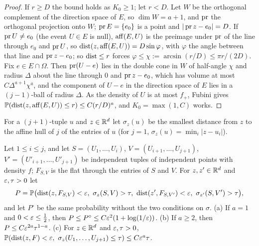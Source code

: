 \documentclass[11pt]{article}
\begin{document}
\begin{proof}
If $r\ge D$ the bound holds as $K_0\ge1$; let $r<D$. Let $W$ be the orthogonal complement of the direction space of $E$, so
$\dim W=a+1$, and $\operatorname{pr}$ the orthogonal projection onto $W$; $\operatorname{pr} E=\{e_0\}$ is a point and $|\operatorname{pr} z-e_0|=D$. If $\operatorname{pr} U\ne e_0$ (the event
$U\in E$ is null), $\operatorname{aff}(E,U)$ is the preimage under $\operatorname{pr}$ of the line through $e_0$ and $\operatorname{pr} U$, so $\operatorname{dist}(z,\operatorname{aff}(E,U))=D\sin\varphi$,
with $\varphi$ the angle between that line and $\operatorname{pr} z-e_0$; so $\operatorname{dist}\le r$ forces $\varphi\le\chi:=\arcsin(r/D)\le\pi r/(2D)$. Fix $e\in E\cap\Omega$.
Then $\operatorname{pr}(U-e)$ lies in the double cone in $W$ of half-angle $\chi$ and radius $\Delta$ about the line through $0$ and $\operatorname{pr} z-e_0$, which
has volume at most $C\Delta^{a+1}\chi^a$, and the component of $U-e$ in the direction space of $E$ lies in a $(j-1)$-ball of radius $\Delta$.
As the density of $U$ is at most $f_+$, Fubini gives $\mathbb{P}(\operatorname{dist}(z,\operatorname{aff}(E,U))\le r)\le C(r/D)^a$, and $K_0=\max(1,C)$ works.
\end{proof}

For a $(j+1)$-tuple $u$ and $z\in\mathbb{R}^d$ let $\sigma_z(u)$ be the smallest distance from $z$ to the affine hull of $j$ of the entries
of $u$ (for $j=1$, $\sigma_z(u)=\min_i|z-u_i|$).

\begin{lemma}\label{lem:share}
Let $1\le i\le j$, and let $S = (U_1, \dots, U_i)$, $V = (U_{i+1}, \dots, U_{j+1})$, $V' = (U'_{i+1}, \dots, U'_{j+1})$ be
independent tuples of independent points with density $f$; $F_{S,V}$ is the flat through the entries of $S$ and $V$. For
$z,z'\in\mathbb{R}^d$ and $\varepsilon,\tau>0$ let
\[
  P=\Pr\bigl(\dist(z,F_{S,V})<\eps,\ \sigma_z(S,V)>\tau,\ \dist(z',F_{S,V'})<\eps,\ \sigma_{z'}(S,V')>\tau\bigr),
\]
and let $P^\circ$ be the same probability without the two conditions on $\sigma$.
(a) If $a=1$ and $0<\varepsilon\le\frac12$, then $P\le P^\circ\le C\varepsilon^2(1+\log(1/\varepsilon))$.
(b) If $a\ge2$, then $P\le C\varepsilon^{2a}\tau^{1-a}$.
(c) For $z\in\mathbb{R}^d$ and $\varepsilon,\tau>0$, $\Pr(\dist(z,F)<\eps,\ \sigma_z(U_1,\dots,U_{j+1})\le\tau)\le C\eps^a\tau$.
\end{lemma}
\end{document}
